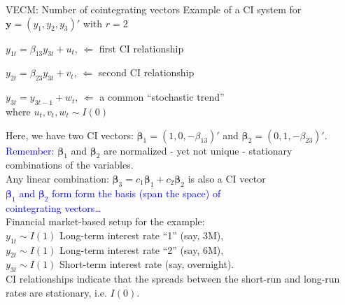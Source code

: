 \documentclass[usenames,dvipsnames]{beamer}
\begin{document}
\begin{frame}{VECM: Number of cointegrating vectors}
\footnotesize
Example of a CI system for $\bm{y} = (y_1, y_2, y_3)'$ with $r=2$
\begin{enumerate}[ {[}1{]} ]
\item $y_{1t} = \beta_{13} y_{3t} + u_t$, \quad  $\Leftarrow$ first CI relationship
\item $y_{2t} = \beta_{23} y_{3t} + v_t$, \quad  $\Leftarrow$ second CI relationship
\item $y_{3t} = y_{3t-1} + w_t$, \hspace*{2.87mm} $\Leftarrow$ a common ``stochastic trend''\\
where $u_t, v_t, w_t \sim I(0)$
\end{enumerate}
Here, we have two CI vectors: $\bm{\beta}_1 = (1,0,-\beta_{13})'$ and $\bm{\beta}_2 = (0,1, -\beta_{23})'$. \\
\medskip
\textcolor{Blue}{Remember:} \quad $\bm{\beta}_1$ and $\bm{\beta}_2$ are normalized - yet not unique - stationary \\ \hspace*{2cm} combinations of the variables. \\
\smallskip
\hspace*{2cm} Any linear combination: $\bm{\beta}_3 = c_1 \bm{\beta}_1 + c_2 \bm{\beta}_2$ is also a CI vector \\
\smallskip
\hspace*{2cm} \textcolor{Blue}{ $\bm{\beta}_1$ and $\bm{\beta}_2$ form form the basis (span the space) of \\ \hspace*{2cm} cointegrating vectors\dots}\\
\medskip
Financial market-based setup for the example:\\
$y_{1t} \sim I(1)$ Long-term interest rate ``1''   (say, 3M), \\ 
$y_{2t} \sim I(1)$ Long-term interest rate ``2''   (say, 6M), \\
$y_{3t} \sim I(1)$ Short-term interest rate (say, overnight).\\
\medskip
CI relationships indicate that the spreads between the short-run and long-run rates are stationary, i.e. $I(0)$.
\end{frame}
\end{document}

